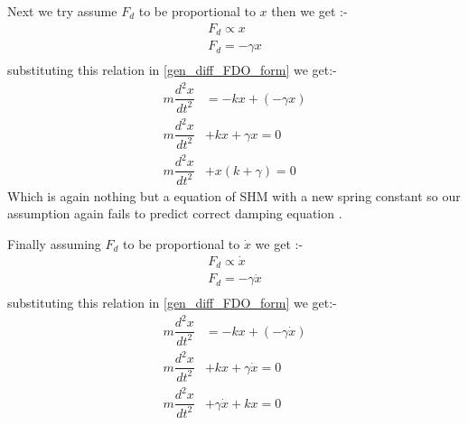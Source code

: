 \documentclass[10pt,twoside]{report}
\begin{document}
Next we try assume  $F_d$ to be proportional to $x$ then we get :-
\begin{align*}
    F_d \propto x \\
    F_d = -\gamma x\\
\end{align*}
substituting this relation in \eqref{gen_diff_FDO_form} we get:-
\begin{align*}
    m \dfrac{d^2x}{dt^2} &= -kx + (-\gamma x) \\
  m \dfrac{d^2x}{dt^2} &+ kx + \gamma x = 0 \\
  m \dfrac{d^2x}{dt^2} &+ x ( k+ \gamma)  = 0 
\end{align*} 
Which is again nothing but a equation of SHM with a new spring constant so our assumption again fails to predict correct damping equation .

Finally assuming  $F_d$ to be proportional to $\dot{x}$  we get :-
\begin{align*}
    F_d \propto \dot{x} \\
    F_d = -\gamma \dot{x}\\
\end{align*}
substituting this relation in \eqref{gen_diff_FDO_form} we get:-
\begin{align*}
    m \dfrac{d^2x}{dt^2} &= -kx + (-\gamma \dot{x}) \\
  m \dfrac{d^2x}{dt^2} &+ kx + \gamma \dot{x} = 0 \\
  m \dfrac{d^2x}{dt^2} &+ \gamma \dot{x} + kx  = 0 
\end{align*} 
\end{document}
